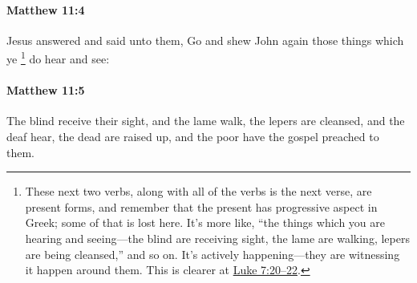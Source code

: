 		\paragraph{Matthew 11:4} %
			\label{MATTHEW-11-4}

			Jesus answered and said unto them, Go and shew John again those things which ye
				\footnote{%
					These next two verbs, along with all of the verbs is the next verse, are present forms, and remember that the present has progressive aspect in Greek; some of that is lost here. It's more like, ``the things which you are hearing and seeing---the blind are receiving sight, the lame are walking, lepers are being cleansed,'' and so on. It's actively happening---they are witnessing it happen around them. This is clearer at \hyperref[LUKE-7-20]{Luke 7:20--22}.
					}%
			do hear and see:

			\begin{framed}
			\scriptsize
				\begin{compactdesc}
					\item[SBLG] 
				\end{compactdesc}
			\end{framed}

		\paragraph{Matthew 11:5} %
			\label{MATTHEW-11-5}

			The blind receive their sight, and the lame walk, the lepers are cleansed, and the deaf hear, the dead are raised up, and the poor have the gospel preached to them.

